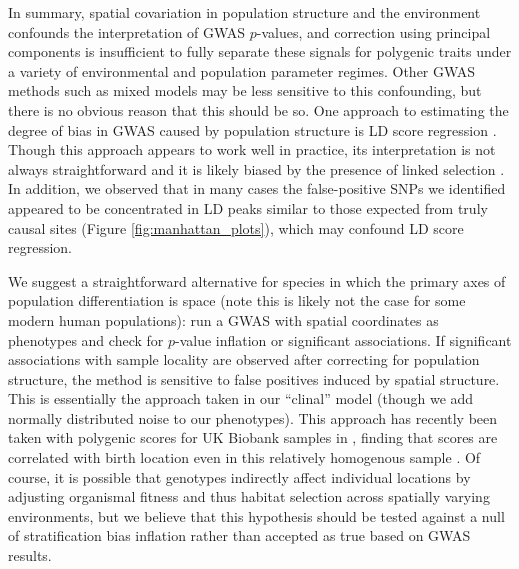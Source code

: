 \documentclass[10pt,twoside,lineno,hidelinks]{preprint}
\begin{document}
In summary, spatial covariation in population structure and the environment confounds the interpretation of GWAS $p$-values, and correction using principal components is insufficient to fully separate these signals for polygenic traits under a variety of environmental and population parameter regimes. 
Other GWAS methods such as mixed models \citep{Kang2008}  may be less sensitive to this confounding, but there is no obvious reason that this should be so. 
One approach to estimating the degree of bias in GWAS caused by population structure is LD score regression \citep{Bulik-Sullivan2015}. 
Though this approach appears to work well in practice, its interpretation is not always straightforward and it is likely biased by the presence of linked selection \citep{Berg2018}. In addition, we observed that in many cases the false-positive SNPs we identified appeared to be concentrated in LD peaks similar to those expected from truly causal sites (Figure \ref{fig:manhattan_plots}), which may confound LD score regression.

We suggest a straightforward alternative for species in which the primary axes of population differentiation is space 
(note this is likely not the case for some modern human populations): 
run a GWAS with spatial coordinates as phenotypes and check for $p$-value inflation or significant associations.
If significant associations with sample locality are observed after correcting for population structure, 
the method is sensitive to false positives induced by spatial structure. This is essentially the approach taken in our ``clinal'' model (though we add normally distributed noise to our phenotypes). This approach has recently been taken with polygenic scores for UK Biobank samples in \cite{haworth2019apparent}, finding that scores are correlated with birth location even in this relatively homogenous sample .
Of course, it is possible that genotypes indirectly affect individual locations by adjusting organismal fitness and thus habitat selection across spatially varying environments, but we believe that this hypothesis should be tested against a null of stratification bias inflation rather than accepted as true based on GWAS results.  

\end{document}
